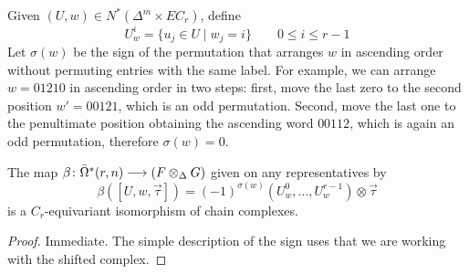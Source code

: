 Given $(U,w)\in N^*(\Delta^m\times EC_r)$, define
\[U_w^i = \{u_j\in U\mid w_j=i\} \qquad 0\leq i\leq r-1\] 
Let $\sigma(w)$ be the sign of the permutation that arranges $w$ in ascending order without permuting entries with the same label. For example, we can arrange $w=01210$ in ascending order in two steps: first, move the last zero to the second position $w' = 00121$, which is an odd permutation. Second, move the last one to the penultimate position obtaining the ascending word $00112$, which is again an odd permutation, therefore $\sigma(w) = 0$.
\begin{lemma}
	The map $\beta\colon \bar{\Omega}^*(r,n)\longrightarrow (F\otimes_\Delta G)$ given on any representatives by
	\[\beta([U,w,\vec{\tau}]) = (-1)^{\sigma(w)}(U_w^0,\ldots, U_w^{r-1})\otimes \vec{\tau}\]
	is a $C_r$-equivariant isomorphism of chain complexes.
\end{lemma}
\begin{proof} Immediate. The simple description of the sign uses that we are working with the shifted complex.\qedhere


\end{proof}
